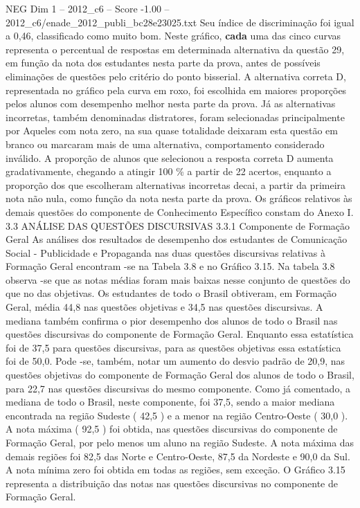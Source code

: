 \begin{textsample}{NEG Dim 1 – 2012\_c6 – Score -1.00 – 2012\_c6/enade\_2012\_publi\_bc28e23025.txt}
Seu índice de discriminação foi igual a 0,46, classificado como muito bom.
Neste gráfico, \textbf{cada} uma das cinco curvas representa o percentual de respostas em determinada alternativa da questão 29, em função da nota dos estudantes nesta parte da prova, antes de possíveis eliminações de questões pelo critério do ponto bisserial.
A alternativa correta D, representada no gráfico pela curva em roxo, foi escolhida em maiores proporções pelos alunos com desempenho melhor nesta parte da prova.
Já as alternativas incorretas, também denominadas distratores, foram selecionadas principalmente por Aqueles com nota zero, na sua quase totalidade deixaram esta questão em branco ou marcaram mais de uma alternativa, comportamento considerado inválido.
A proporção de alunos que selecionou a resposta correta D aumenta gradativamente, chegando a atingir 100 \% a partir de 22 acertos, enquanto a proporção dos que escolheram alternativas incorretas decai, a partir da primeira nota não nula, como função da nota nesta parte da prova.
Os gráficos relativos às demais questões do componente de Conhecimento Específico constam do Anexo I. 3.3 ANÁLISE DAS QUESTÕES DISCURSIVAS 3.3.1 Componente de Formação Geral As análises dos resultados de desempenho dos estudantes de Comunicação Social - Publicidade e Propaganda nas duas questões discursivas relativas à Formação Geral encontram -se na Tabela 3.8 e no Gráfico 3.15.
Na tabela 3.8 observa -se que as notas médias foram mais baixas nesse conjunto de questões do que no das objetivas.
Os estudantes de todo o Brasil obtiveram, em Formação Geral, média 44,8 nas questões objetivas e 34,5 nas questões discursivas.
A mediana também confirma o pior desempenho dos alunos de todo o Brasil nas questões discursivas do componente de Formação Geral.
Enquanto essa estatística foi de 37,5 para questões discursivas, para as questões objetivas essa estatística foi de 50,0.
Pode -se, também, notar um aumento do desvio padrão de 20,9, nas questões objetivas do componente de Formação Geral dos alunos de todo o Brasil, para 22,7 nas questões discursivas do mesmo componente.
Como já comentado, a mediana de todo o Brasil, neste componente, foi 37,5, sendo a maior mediana encontrada na região Sudeste ( 42,5 ) e a menor na região Centro-Oeste ( 30,0 ).
A nota máxima ( 92,5 ) foi obtida, nas questões discursivas do componente de Formação Geral, por pelo menos um aluno na região Sudeste.
A nota máxima das demais regiões foi 82,5 das Norte e Centro-Oeste, 87,5 da Nordeste e 90,0 da Sul.
A nota mínima zero foi obtida em todas as regiões, sem exceção.
O Gráfico 3.15 representa a distribuição das notas nas questões discursivas no componente de Formação Geral.

\end{textsample}
